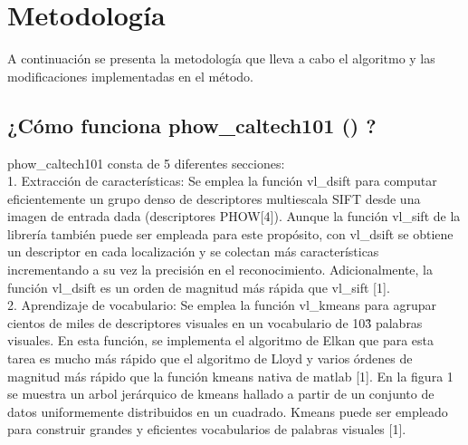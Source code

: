 \documentclass[10pt,twocolumn,letterpaper]{article}
\begin{document}
\section{Metodología}

A continuación se presenta la metodología que lleva a cabo el algoritmo y las modificaciones implementadas en el método.

\subsection{¿Cómo funciona phow\_caltech101 () ?}

phow\_caltech101 consta de 5 diferentes secciones:\\

1. Extracción de características: Se emplea la función vl\_dsift para computar eficientemente un grupo denso de descriptores multiescala SIFT desde una imagen de entrada dada (descriptores PHOW[4]). Aunque la función vl\_sift de la librería también puede ser empleada para este propósito, con vl\_dsift se obtiene un descriptor en cada localización y se colectan más características incrementando a su vez la precisión en el reconocimiento. Adicionalmente, la función vl\_dsift es un orden de magnitud más rápida que vl\_sift [1].\\

2. Aprendizaje de vocabulario: Se emplea la función vl\_kmeans para agrupar cientos de miles de descriptores visuales en un vocabulario de 10\^3 palabras visuales. En esta función, se implementa el algoritmo de Elkan que para esta tarea es mucho más rápido que el algoritmo de Lloyd y varios órdenes de magnitud más rápido que la función kmeans nativa de matlab [1]. En la figura 1 se muestra un arbol jerárquico de kmeans hallado a partir de un conjunto de datos uniformemente distribuidos en un cuadrado. Kmeans puede ser empleado para construir grandes y eficientes vocabularios de palabras visuales [1].\\
\end{document}
